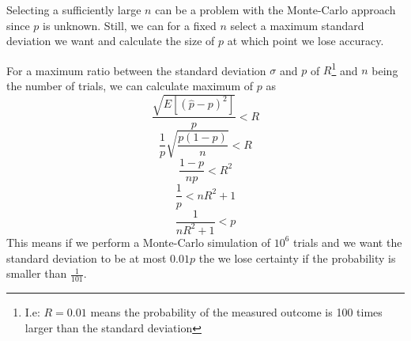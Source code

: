 Selecting a sufficiently large \(n\) can be a problem with the Monte-Carlo approach since \(p\) is unknown. Still, we can for a fixed \(n\) select a maximum standard deviation we want and calculate the size of \(p\) at which point we lose accuracy. 

For a maximum ratio between the standard deviation \(\sigma\) and \(p\) of \(R\)\footnote{I.e: \(R=0.01\) means the probability of the measured outcome is 100 times larger than the standard deviation} and \(n\) being the number of trials, we can calculate maximum of \(p\) as
\begin{equation*}
    \frac{\sqrt{E[(\hat{p}-p)^{2}]}}{p} < R
\end{equation*}
\begin{equation*}
    \frac{1}{p}\sqrt{\frac{p(1-p)}{n}} < R
\end{equation*}
\begin{equation*}
    \frac{1-p}{np} < R^{2}
\end{equation*}
\begin{equation*}
    \frac{1}{p}< nR^{2}+1
\end{equation*}
\begin{equation}
    \frac{1}{nR^{2}+1}<p
    \label{eq:montecarloP}
\end{equation}
This means if we perform a Monte-Carlo simulation of \(10^{6}\) trials and we want the standard deviation to be at most \(0.01p\) the we lose certainty if the probability is smaller than \(\frac{1}{101}\).

